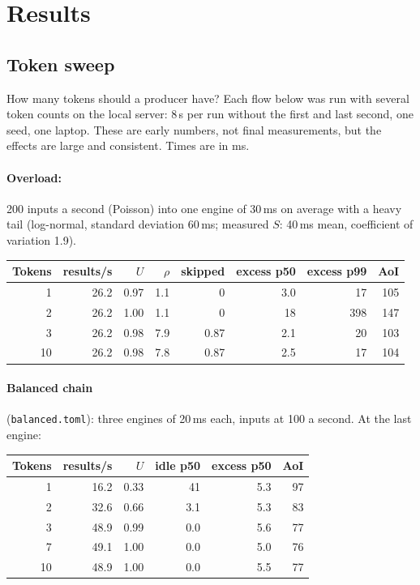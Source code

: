 \documentclass[11pt]{article}
\newcommand{\code}[1]{\texttt{#1}}
\begin{document}
\section{Results}

\subsection{Token sweep}

How many tokens should a producer have? Each flow below was run with
several token counts on the local server: 8\,s per run without the first and
last second, one seed, one laptop. These are early numbers, not final
measurements, but the effects are large and consistent. Times are in ms.

\paragraph{Overload:} 200 inputs a second (Poisson) into one engine of
30\,ms on average with a heavy tail (log-normal, standard deviation 60\,ms;
measured $S$: 40\,ms mean, coefficient of variation 1.9).
\begin{center}
\small
\begin{tabular}{@{}rrrrrrrr@{}}
\toprule
Tokens & results/s & $U$ & $\rho$ & skipped & excess p50 & excess p99 & AoI \\
\midrule
1  & 26.2 & 0.97 & 1.1 & 0    & 3.0 & 17  & 105 \\
2  & 26.2 & 1.00 & 1.1 & 0    & 18  & 398 & 147 \\
3  & 26.2 & 0.98 & 7.9 & 0.87 & 2.1 & 20  & 103 \\
10 & 26.2 & 0.98 & 7.8 & 0.87 & 2.5 & 17  & 104 \\
\bottomrule
\end{tabular}
\end{center}

\paragraph{Balanced chain} (\code{balanced.toml}): three engines of 20\,ms each, inputs at 100 a
second. At the last engine:
\begin{center}
\small
\begin{tabular}{@{}rrrrrr@{}}
\toprule
Tokens & results/s & $U$ & idle p50 & excess p50 & AoI \\
\midrule
1  & 16.2 & 0.33 & 41  & 5.3 & 97 \\
2  & 32.6 & 0.66 & 3.1 & 5.3 & 83 \\
3  & 48.9 & 0.99 & 0.0 & 5.6 & 77 \\
7  & 49.1 & 1.00 & 0.0 & 5.0 & 76 \\
10 & 48.9 & 1.00 & 0.0 & 5.5 & 77 \\
\bottomrule
\end{tabular}
\end{center}
\end{document}
